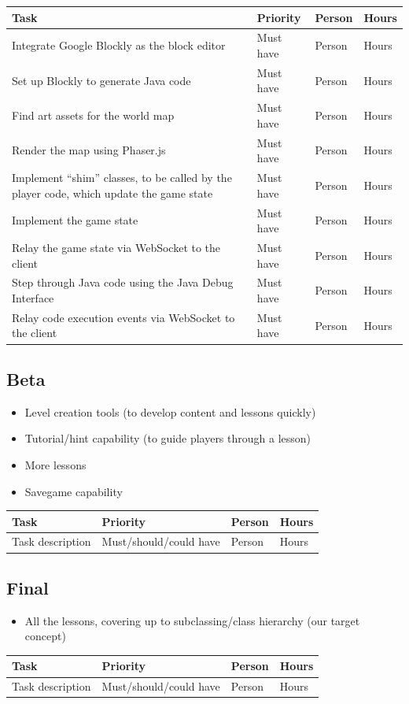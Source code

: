 \documentclass[12pt,notitlepage]{article}
\begin{document}
\begin{tabu}{Xlll}
\toprule
Task & Priority & Person & Hours \\
\midrule
Integrate Google Blockly as the block editor & Must have & Person & Hours \\
Set up Blockly to generate Java code & Must have & Person & Hours \\
Find art assets for the world map & Must have & Person & Hours \\
Render the map using Phaser.js & Must have & Person & Hours \\
Implement ``shim'' classes, to be called by the player code, which update the game state & Must have & Person & Hours \\
Implement the game state & Must have & Person & Hours \\
Relay the game state via WebSocket to the client & Must have & Person & Hours \\
Step through Java code using the Java Debug Interface & Must have & Person & Hours \\
Relay code execution events via WebSocket to the client & Must have & Person & Hours \\
\bottomrule
\end{tabu}

\subsection{Beta}

\begin{itemize}
\item Level creation tools (to develop content and lessons quickly)
\item Tutorial/hint capability (to guide players through a lesson)
\item More lessons
\item Savegame capability
\end{itemize}

\begin{tabu}{lXXl}
\toprule
Task & Priority & Person & Hours \\
\midrule
Task description & Must/should/could have & Person & Hours \\
\bottomrule
\end{tabu}

\subsection{Final}
\begin{itemize}
\item All the lessons, covering up to subclassing/class hierarchy (our
  target concept)
\end{itemize}

\begin{tabu}{lXXl}
\toprule
Task & Priority & Person & Hours \\
\midrule
Task description & Must/should/could have & Person & Hours \\
\bottomrule
\end{tabu}
\end{document}
